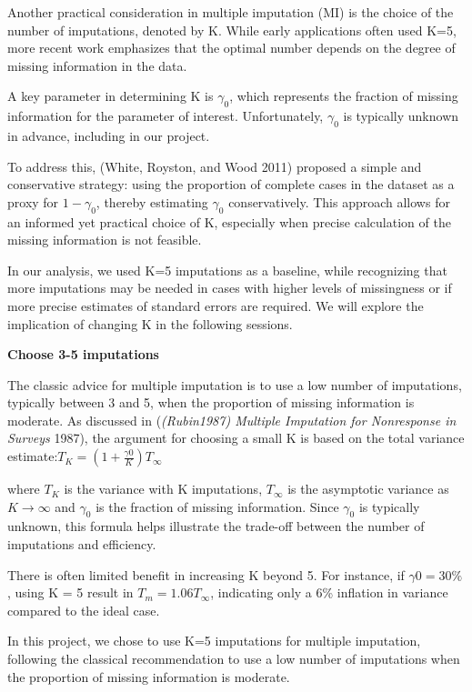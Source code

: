 \documentclass{article}
\begin{document}
Another practical consideration in multiple imputation (MI) is the
choice of the number of imputations, denoted by K. While early
applications often used K=5, more recent work emphasizes that the
optimal number depends on the degree of missing information in the data.

A key parameter in determining K is \(\gamma_{0}\), which represents the
fraction of missing information for the parameter of interest.
Unfortunately, \(\gamma_{0}\) is typically unknown in advance, including
in our project.

To address this, (White, Royston, and Wood 2011) proposed a simple and
conservative strategy: using the proportion of complete cases in the
dataset as a proxy for \(1-\gamma_{0}\), thereby estimating
\(\gamma_{0}\) conservatively. This approach allows for an informed yet
practical choice of K, especially when precise calculation of the
missing information is not feasible.

In our analysis, we used K=5 imputations as a baseline, while
recognizing that more imputations may be needed in cases with higher
levels of missingness or if more precise estimates of standard errors
are required. We will explore the implication of changing K in the
following sessions.

\textbf{Choose 3-5 imputations}

The classic advice for multiple imputation is to use a low number of
imputations, typically between 3 and 5, when the proportion of missing
information is moderate. As discussed in (\emph{({Rubin1987}) {Multiple}
{Imputation} for {Nonresponse} in {Surveys}} 1987), the argument for
choosing a small K is based on the total variance
estimate:\(T_{K} = (1 + \frac{\gamma0}{K}) T_{\infty}\)

where \(T_{K}\) is the variance with K imputations, \(T_{\infty}\) is
the asymptotic variance as \(K \rightarrow \infty\) and \(\gamma_{0}\)
is the fraction of missing information. Since \(\gamma_{0}\) is
typically unknown, this formula helps illustrate the trade-off between
the number of imputations and efficiency.

There is often limited benefit in increasing K beyond 5. For instance,
if \(\gamma0=30\%\), using K = 5 result in \(T_m=1.06T_\infty\),
indicating only a 6\% inflation in variance compared to the ideal case.

In this project, we chose to use K=5 imputations for multiple
imputation, following the classical recommendation to use a low number
of imputations when the proportion of missing information is moderate.
\end{document}
